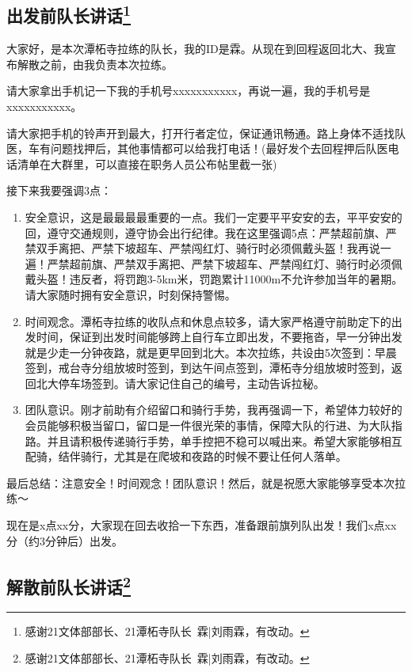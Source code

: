 \documentclass[UTF8]{ctexart}
\begin{document}
\subsection[出发前队长讲话]{出发前队长讲话\protect\footnote{感谢21文体部部长、21潭柘寺队长\ 霖|刘雨霖，有改动。}}

大家好，是本次潭柘寺拉练的队长，我的ID是霖。从现在到回程返回北大、我宣布解散之前，由我负责本次拉练。

请大家拿出手机记一下我的手机号xxxxxxxxxxx，再说一遍，我的手机号是xxxxxxxxxxx。

请大家把手机的铃声开到最大，打开行者定位，保证通讯畅通。路上身体不适找队医，车有问题找押后，其他事情都可以给我打电话！(最好发个去回程押后队医电话清单在大群里，可以直接在职务人员公布帖里截一张)

接下来我要强调3点：
\begin{enumerate}[nosep,left=4em]
    \item 安全意识，这是最最最最重要的一点。我们一定要平平安安的去，平平安安的回，遵守交通规则，遵守协会出行纪律。我在这里强调5点：严禁超前旗、严禁双手离把、严禁下坡超车、严禁闯红灯、骑行时必须佩戴头盔！我再说一遍！严禁超前旗、严禁双手离把、严禁下坡超车、严禁闯红灯、骑行时必须佩戴头盔！违反者，将罚跑3-5km米，罚跑累计11000m不允许参加当年的暑期。请大家随时拥有安全意识，时刻保持警惕。
    \item 时间观念。潭柘寺拉练的收队点和休息点较多，请大家严格遵守前助定下的出发时间，保证到出发时间能够跨上自行车立即出发，不要拖沓，早一分钟出发就是少走一分钟夜路，就是更早回到北大。本次拉练，共设由5次签到：早晨签到，戒台寺分组放坡时签到，到达午间点签到，潭柘寺分组放坡时签到，返回北大停车场签到。请大家记住自己的编号，主动告诉拉秘。
    \item 团队意识。刚才前助有介绍留口和骑行手势，我再强调一下，希望体力较好的会员能够积极当留口，留口是一件很光荣的事情，保障大队的行进、为大队指路。并且请积极传递骑行手势，单手控把不稳可以喊出来。希望大家能够相互配骑，结伴骑行，尤其是在爬坡和夜路的时候不要让任何人落单。
\end{enumerate}

最后总结：注意安全！时间观念！团队意识！然后，就是祝愿大家能够享受本次拉练～

现在是x点xx分，大家现在回去收拾一下东西，准备跟前旗列队出发！我们x点xx分（约3分钟后）出发。

\subsection[解散前队长讲话]{解散前队长讲话\protect\footnote{感谢21文体部部长、21潭柘寺队长\ 霖|刘雨霖，有改动。}}
\end{document}
